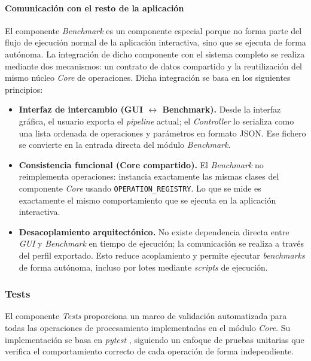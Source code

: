 \newpage

\paragraph{Comunicación con el resto de la aplicación} \label{par:7_3_6_3_comunicacion_benchmark}
El componente \textit{Benchmark} es un componente especial porque no forma parte del flujo de ejecución normal de la aplicación interactiva, 
sino que se ejecuta de forma autónoma. 
La integración de dicho componente con el sistema completo se realiza mediante dos
mecanismos: un contrato de datos compartido y la reutilización del mismo núcleo \textit{Core} de operaciones. Dicha integración 
se basa en los siguientes principios:

\begin{itemize}[noitemsep]
    \item \textbf{Interfaz de intercambio (GUI $\leftrightarrow$ Benchmark).}
    Desde la interfaz gráfica, el usuario exporta el \textit{pipeline} actual; el \textit{Controller}
    lo serializa como una lista ordenada de operaciones y parámetros en formato JSON.
    Ese fichero se convierte en la entrada directa del módulo \textit{Benchmark}.
    \item \textbf{Consistencia funcional (Core compartido).}
    El \textit{Benchmark} no reimplementa operaciones: instancia exactamente las mismas clases
    del componente \textit{Core} usando \texttt{OPERATION\_REGISTRY}. Lo que se mide es exactamente el mismo
    comportamiento que se ejecuta en la aplicación interactiva.
    \item \textbf{Desacoplamiento arquitectónico.}
    No existe dependencia directa entre \textit{GUI} y \textit{Benchmark} en tiempo de ejecución;
    la comunicación se realiza a través del perfil exportado. Esto reduce acoplamiento y permite
    ejecutar \textit{benchmarks} de forma autónoma, incluso por lotes mediante \textit{scripts} de ejecución.
\end{itemize}

\newpage

\subsubsection{Tests} \label{subsubsec:7_3_7_tests}
El componente \textit{Tests} proporciona un marco de validación automatizada para todas las operaciones
de procesamiento implementadas en el módulo \textit{Core}. Su implementación se basa en \textit{pytest}
\cite{pytest}, siguiendo un enfoque de pruebas unitarias que verifica el comportamiento correcto de
cada operación de forma independiente.

